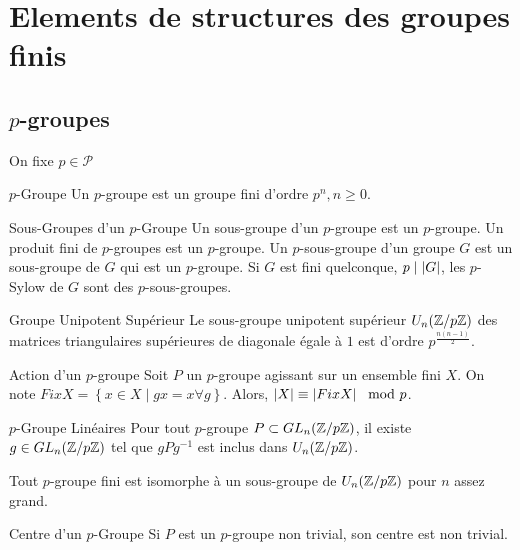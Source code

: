 \documentclass{cours}
\begin{document}
\section{Elements de structures des groupes finis}
\subsection{$p$-groupes}
On fixe $p \in \mathcal{P}$

\begin{définition}{$p$-Groupe}{}
    Un $p$-groupe est un groupe fini d'ordre $p^{n}, n\geq 0$.
\end{définition}

\begin{propositionfr}{Sous-Groupes d'un $p$-Groupe}{}
    Un sous-groupe d'un $p$-groupe est un $p$-groupe. Un produit fini de $p$-groupes est un $p$-groupe. Un $p$-sous-groupe d'un groupe $G$ est un sous-groupe de $G$ qui est un $p$-groupe. Si $G$ est fini quelconque, $p \mid \left|G\right|$, les $p$-Sylow de $G$ sont des $p$-sous-groupes.
\end{propositionfr}

\begin{définition}{Groupe Unipotent Supérieur}{}
    Le sous-groupe unipotent supérieur $U_{n}(\mathbb{Z}/p\mathbb{Z})$ des matrices triangulaires supérieures de diagonale égale à $1$ est d'ordre $p^{\frac{n(n-1)}{2}}$.
\end{définition}

\begin{propositionfr}{Action d'un $p$-groupe}{}
    Soit $P$ un $p$-groupe agissant sur un ensemble fini $X$. On note $Fix X = \left\{x \in X \mid gx = x \forall g\right\}$. Alors, $\left|X\right| \equiv \left|Fix X\right| \mod p$.
\end{propositionfr}

\begin{propositionfr}{$p$-Groupe Linéaires}{}
    Pour tout $p$-groupe $P \subset GL_{n}(\mathbb{Z}/p\mathbb{Z})$, il existe $g \in GL_{n}(\mathbb{Z}/p\mathbb{Z})$ tel que $gPg^{-1}$ est inclus dans $U_{n}(\mathbb{Z}/p\mathbb{Z})$.
\end{propositionfr}

\begin{corollaire}{}{}
    Tout $p$-groupe fini est isomorphe à un sous-groupe de $U_{n}(\mathbb{Z}/p\mathbb{Z})$ pour $n$ assez grand.
\end{corollaire}

\begin{propositionfr}{Centre d'un $p$-Groupe}{}
    Si $P$ est un $p$-groupe non trivial, son centre est non trivial.
\end{propositionfr}
\end{document}
